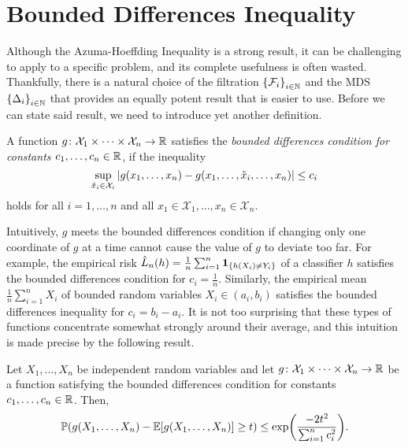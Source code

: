 \section{Bounded Differences Inequality}

Although the Azuma-Hoeffding Inequality is a strong result, it can be challenging to apply to a specific problem, and its complete usefulness is often wasted. Thankfully, there is a natural choice of the filtration $\set{\mathcal{F}_i}_{i \in \N}$ and the MDS $\set{\Delta_i}_{i \in \N}$ that provides an equally potent result that is easier to use. Before we can state said result, we need to introduce yet another definition.

\begin{definition}
A function $g \colon \mathcal{X}_1 \times \dots \times \mathcal{X}_n \to \mathbb{R}$ satisfies the \emph{bounded differences condition for constants $c_1, \dots, c_n \in \mathbb{R}$}, if the inequality
\[
    \sup_{\tilde{x}_i \in \mathcal{X}_i} \abs{g(x_1, \dots, x_n) - g(x_1, \dots, \tilde{x}_i, \dots, x_n)} \leq c_i
\]
holds for all $i = 1, \dots, n$ and all $x_1 \in \mathcal{X}_1, \dots, x_n \in \mathcal{X}_n$.
\end{definition}

Intuitively, $g$ meets the bounded differences condition if changing only one coordinate of $g$ at a time cannot cause the value of $g$ to deviate too far. For example, the empirical risk $\hat{L}_n(h) = \frac{1}{n} \sum_{i=1}^n \indSet{h(X_i) \neq Y_i}$ of a classifier $h$ satisfies the bounded differences condition for $c_i = \frac{1}{n}$. Similarly, the empirical mean $\frac{1}{n} \sum_{i=1}^n X_i$ of bounded random variables $X_i \in (a_i, b_i)$ satisfies the bounded differences inequality for $c_i = b_i - a_i$. It is not too surprising that these types of functions concentrate somewhat strongly around their average, and this intuition is made precise by the following result.

\begin{theorem}
\label{thm: bounded differences inequality}
Let $X_1, \dots, X_n$ be independent random variables and let $g \colon \mathcal{X}_1 \times \dots \times \mathcal{X}_n \to \mathbb{R}$ be a function satisfying the bounded differences condition for constants $c_1, \dots, c_n \in \mathbb{R}$. Then,
\[
    \mathbb{P}(g(X_1, \dots, X_n) - \operatorname{\mathbb{E}}[g(X_1, \dots, X_n)] \geq t) \leq \exp(\frac{-2t^2}{\sum_{i=1}^n c_i^2}).
\]
\end{theorem}

